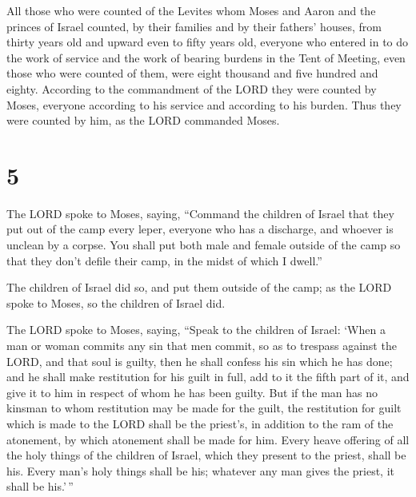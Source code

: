  All those who were counted of the Levites whom Moses and
Aaron and the princes of Israel counted, by their families and by their
fathers' houses,  from thirty years old and upward even
to fifty years old, everyone who entered in to do the work of service
and the work of bearing burdens in the Tent of Meeting, 
even those who were counted of them, were eight thousand and five
hundred and eighty.  According to the commandment of the
LORD they were counted by Moses, everyone according to his service and
according to his burden. Thus they were counted by him, as the LORD
commanded Moses.

\hypertarget{section-4}{%
\section{5}\label{section-4}}

 The LORD spoke to Moses, saying,  ``Command
the children of Israel that they put out of the camp every leper,
everyone who has a discharge, and whoever is unclean by a corpse.
 You shall put both male and female outside of the camp so
that they don't defile their camp, in the midst of which I dwell.''

 The children of Israel did so, and put them outside of
the camp; as the LORD spoke to Moses, so the children of Israel did.

 The LORD spoke to Moses, saying,  ``Speak
to the children of Israel: `When a man or woman commits any sin that men
commit, so as to trespass against the LORD, and that soul is guilty,
 then he shall confess his sin which he has done; and he
shall make restitution for his guilt in full, add to it the fifth part
of it, and give it to him in respect of whom he has been guilty.
 But if the man has no kinsman to whom restitution may be
made for the guilt, the restitution for guilt which is made to the LORD
shall be the priest's, in addition to the ram of the atonement, by which
atonement shall be made for him.  Every heave offering of
all the holy things of the children of Israel, which they present to the
priest, shall be his.  Every man's holy things shall be
his; whatever any man gives the priest, it shall be his.'\,''

